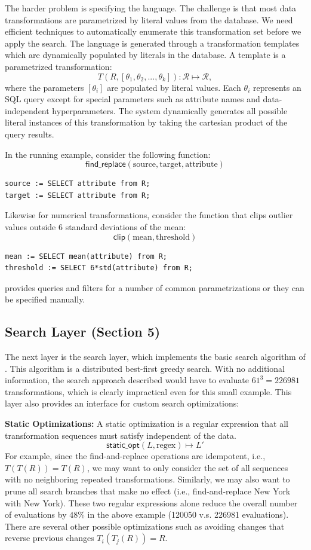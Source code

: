 The harder problem is specifying the language. 
The challenge is that most data transformations are parametrized by literal values from the database.
We need efficient techniques to automatically enumerate this transformation set before we apply the search.
The language is generated through a transformation templates which are dynamically populated by literals in the database.
A template is a parametrized transformation:
\[T(R, [\theta_1, \theta_2,...,\theta_k] ): \mathcal{R} \mapsto  \mathcal{R},\] where the parameters $[\theta_i]$ are populated by literal values.
Each $\theta_i$ represents an SQL query except for special parameters such as attribute names and data-independent hyperparameters.
The system dynamically generates all possible literal instances of this transformation by taking the cartesian product of the query results.

In the running example, consider the following function:
\[
\textsf{find\_replace}(\text{source}, \text{target}, \text{attribute})
\]
\begin{lstlisting}
source := SELECT attribute from R;
target := SELECT attribute from R;
\end{lstlisting}
Likewise for numerical transformations, consider the function that clips outlier values outside 6 standard deviations of the mean:
\[
\textsf{clip}(\text{mean}, \text{threshold})
\]
\begin{lstlisting}
mean := SELECT mean(attribute) from R;
threshold := SELECT 6*std(attribute) from R;
\end{lstlisting}
\sys provides queries and filters for a number of common parametrizations or they can be specified manually.

\subsection{Search Layer (Section 5)} The next layer is the search layer, which implements the basic search algorithm of \sys. This algorithm is a distributed best-first greedy search.  
With no additional information, the search approach described would have to evaluate $61^3 = 226981$ transformations, which is clearly impractical even for this small example.
This layer also provides an interface for custom search optimizations:

\vspace{0.5em}\noindent\textbf{Static Optimizations: } A static optimization is a regular expression that all transformation sequences must satisfy independent of the data. 
\[\textsf{static\_opt}(L, \text{regex} ) \mapsto L'\]
For example, since the find-and-replace operations are idempotent, i.e., $T(T(R)) = T(R)$, we may want to only consider the set of all sequences with no neighboring repeated transformations. Similarly, we may also want to prune all search branches that make no effect (i.e., find-and-replace New York with New York).
These two regular expressions alone reduce the overall number of evaluations by $48\%$ in the above example (120050 v.s. 226981 evaluations).
There are several other possible optimizations  such as avoiding changes that reverse previous changes $T_i(T_j(R)) = R$.


